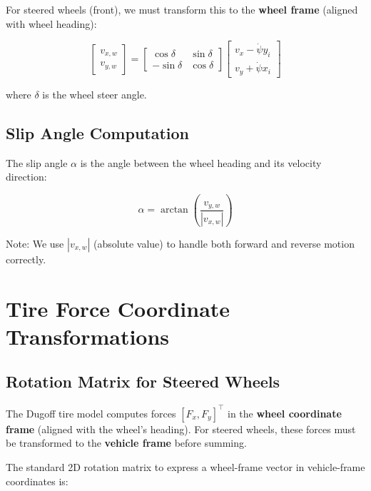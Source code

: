 \documentclass[11pt,a4paper]{article}
\begin{document}
For steered wheels (front), we must transform this to the \textbf{wheel frame} (aligned with wheel heading):

\begin{equation}
\begin{bmatrix} v_{x,w} \\ v_{y,w} \end{bmatrix} = \begin{bmatrix} \cos\delta & \sin\delta \\ -\sin\delta & \cos\delta \end{bmatrix} \begin{bmatrix} v_x - \dot{\psi} y_i \\ v_y + \dot{\psi} x_i \end{bmatrix}
\end{equation}

where $\delta$ is the wheel steer angle.

\subsection{Slip Angle Computation}

The slip angle $\alpha$ is the angle between the wheel heading and its velocity direction:

\begin{equation}
\alpha = \arctan\left(\frac{v_{y,w}}{|v_{x,w}|}\right)
\end{equation}

Note: We use $|v_{x,w}|$ (absolute value) to handle both forward and reverse motion correctly.

\section{Tire Force Coordinate Transformations}

\subsection{Rotation Matrix for Steered Wheels}

The Dugoff tire model computes forces $[F_x, F_y]^\top$ in the \textbf{wheel coordinate frame} (aligned with the wheel's heading). For steered wheels, these forces must be transformed to the \textbf{vehicle frame} before summing.

The standard 2D rotation matrix to express a wheel-frame vector in vehicle-frame coordinates is:
\end{document}
